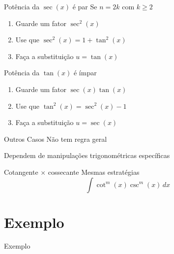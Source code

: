 \begin{frame}{Potência da $\sec(x)$ é par}
  Se $n = 2k$ com $k \geq 2$
  \begin{enumerate}[<+->]
    \setlength\itemsep{1em}
    \item Guarde um fator $\sec^2(x)$
    \item Use que $\sec^2(x) = 1 + \tan^2(x)$
    \item Faça a substituição $u = \tan(x)$
  \end{enumerate}
\end{frame}

\begin{frame}{Potência da $\tan(x)$ é ímpar}
  \begin{enumerate}[<+->]
    \setlength\itemsep{1em}
    \item Guarde um fator $\sec(x)\tan(x)$
    \item Use que $\tan^2(x)=\sec^2(x)-1$
    \item Faça a substituição $u=\sec(x)$
  \end{enumerate}
\end{frame}

\begin{frame}{Outros Casos}
  Não tem regra geral

  Dependem de manipulações trigonométricas específicas
\end{frame}

\begin{frame}{Cotangente $\times$ cossecante}
  Mesmas estratégias
  \[
    \int \cot^m(x) \csc^m(x)\,dx
  \]
\end{frame}

\addtocounter{exemplo}{1}
\section{Exemplo \theexemplo}

\begin{frame}{Exemplo \theexemplo}

  \vspace{\baselineskip}


\end{frame}

